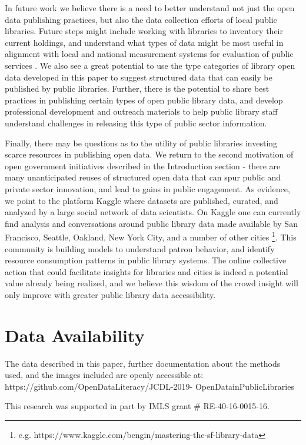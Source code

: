 \documentclass[sigconf]{acmart}
\begin{document}
In future work we believe there is a need to better understand not just the open data publishing practices, but also the data collection efforts of local public libraries. Future steps might include working with libraries to inventory their current holdings, and understand what types of data might be most useful in alignment with local and national measurement systems for evaluation of public services \cite{smith2017landscape}. We also see a great potential to use the type categories of library open data developed in this paper to suggest structured data that can easily be published by public libraries. Further, there is the potential to share best practices in publishing certain types of open public library data, and develop professional development and outreach materials to help public library staff understand challenges in releasing this type of public sector information.

Finally, there may be questions as to the utility of public libraries investing scarce resources in publishing open data. We return to the second motivation of open government initiatives described in the Introduction section - there are many unanticipated reuses of structured open data that can spur public and private sector innovation, and lead to gains in public engagement. As evidence, we point to the platform Kaggle where datasets are published, curated, and analyzed by a large social network of data scientists. On Kaggle one can currently find analysis and conversations around public library data made available by San Francisco, Seattle, Oakland, New York City, and a number of other cities \footnote{e.g. https://www.kaggle.com/bengin/mastering-the-sf-library-data}. This community is building models to understand patron behavior, and identify resource consumption patterns in public library systems. The online collective action that could facilitate insights for libraries and cities is indeed a potential value already being realized, and we believe this wisdom of the crowd insight will only improve with greater public library data accessibility.

\section{Data Availability}
The data described in this paper, further documentation about the methods used, and the images included are openly accessible at:  https://github.com/OpenDataLiteracy/JCDL-2019-
OpenDatainPublicLibraries

%
\begin{acks}
This research was supported in part by IMLS grant # RE-40-16-0015-16.
\end{acks}

%



%
\end{document}
